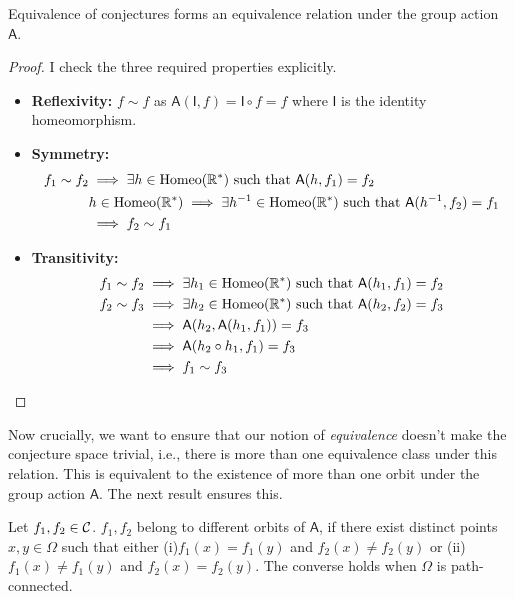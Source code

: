 \begin{prop}
    \label{prop:equivalent-conjectures}
    Equivalence of conjectures forms an equivalence relation under the group action $\mathsf{A}$.
\end{prop}
\begin{proof}
    I check the three required properties explicitly.
    \begin{itemize}
        \item \textbf{Reflexivity:} $f\sim f$ as $\mathsf{A}(\mathsf{I}, f) = \mathsf{I}\circ f = f$ where $\mathsf{I}$ is the identity homeomorphism.
        \item \textbf{Symmetry:} 
            \begin{align*}
                f_1\sim f_2 &\implies \exists h\in\text{Homeo}(\mathbb{R}^*) \text{ such that } \mathsf{A}(h, f_1) = f_2\\
                &h\in\text{Homeo}(\mathbb{R}^*)\implies \exists h^{-1}\in\text{Homeo}(\mathbb{R}^*) \text{ such that } \mathsf{A}(h^{-1}, f_2) = f_1\\
                &\implies f_2\sim f_1
            \end{align*}
        \item \textbf{Transitivity:}
            \begin{align*}
                f_1\sim f_2 &\implies \exists h_1\in\text{Homeo}(\mathbb{R}^*) \text{ such that } \mathsf{A}(h_1, f_1) = f_2\\
                f_2\sim f_3 &\implies \exists h_2\in\text{Homeo}(\mathbb{R}^*) \text{ such that } \mathsf{A}(h_2, f_2) = f_3\\
                &\implies \mathsf{A}(h_2, \mathsf{A}(h_1, f_1)) = f_3\\
                &\implies \mathsf{A}(h_2\circ h_1, f_1) = f_3\\
                &\implies f_1\sim f_3    
            \end{align*}
    \end{itemize}
\end{proof}

Now crucially, we want to ensure that our notion of \textit{equivalence} doesn't make the conjecture space trivial, i.e., there is more than one equivalence class under this relation. This is equivalent to the existence of more than one orbit under the group action $\mathsf{A}$.
The next result ensures this.

\begin{theorem}
    Let $f_1, f_2\in\mathcal{C}$. $f_1,f_2$ belong to different orbits of $\mathsf{A}$, if there exist distinct points $x,y\in\Omega$ such that either (i)$f_1(x) = f_1(y)$ and $f_2(x)\neq f_2(y)$ or (ii)$f_1(x)\neq f_1(y)$ and $f_2(x) = f_2(y)$. The converse holds when $\Omega$ is path-connected.
\end{theorem}


